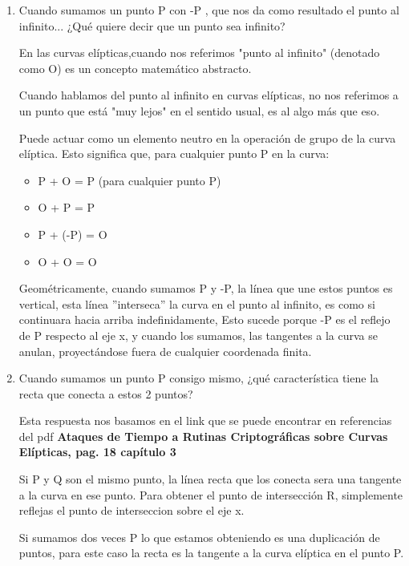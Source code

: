 \documentclass{article}
\begin{document}
\begin{enumerate}

    \item Cuando sumamos un punto P con -P , que nos da como resultado el punto al infinito... ¿Qué quiere decir que un punto sea infinito?

    En las curvas elípticas,cuando nos referimos "punto al infinito" (denotado como O) es un concepto matemático abstracto.

    Cuando hablamos del punto al infinito en curvas elípticas, no nos referimos a un punto que está "muy lejos" en el sentido usual, es al algo más que eso.

    Puede actuar como un elemento neutro en la operación de grupo de la curva elíptica. Esto significa que, para cualquier punto P en la curva:
    \begin{itemize}
        \item P + O = P (para cualquier punto P)

        \item O + P = P

        \item P + (-P) = O

        \item O + O = O
    \end{itemize}
    
    Geométricamente, cuando sumamos P y -P, la línea que une estos puntos es vertical, esta línea ''interseca'' la curva en el punto al infinito, es como si continuara hacia arriba indefinidamente, Esto sucede porque -P es el reflejo de P respecto al eje x, y cuando los sumamos, las tangentes a la curva se anulan, proyectándose fuera de cualquier coordenada finita.

    \item Cuando sumamos un punto P consigo mismo, ¿qué característica tiene la recta que conecta a estos 2 puntos?

    Esta respuesta nos basamos en el link que se puede encontrar en referencias del pdf \textbf{Ataques de Tiempo a Rutinas Criptográficas sobre Curvas Elípticas, pag. 18 capítulo 3}

    Si P y Q son el mismo punto, la línea recta que los conecta sera una tangente a la curva en ese punto. Para obtener el punto de intersección R, simplemente reflejas el punto de interseccion sobre el eje x. 

    Si sumamos dos veces P lo que estamos obteniendo es una duplicación de puntos, para este caso la recta es la tangente a la curva elíptica en el punto P.


\end{enumerate}
\end{document}
